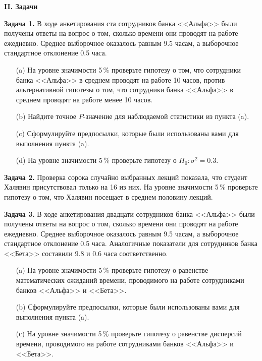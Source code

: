 \documentclass[a4paper, 12pt]{article}
\begin{document}
\textbf{II. Задачи}

\medskip

\textbf{Задача 1.} В ходе анкетирования ста сотрудников банка <<Альфа>> были получены ответы на вопрос о том, сколько времени они проводят на работе ежедневно. Среднее выборочное оказалось равным 9.5 часам, а выборочное стандартное отклонение 0.5 часа.
\begin{itemize}
  \item[(a)] На уровне значимости 5\,\% проверьте гипотезу о том, что сотрудники банка <<Альфа>> в среднем проводят на работе 10 часов, против альтернативной гипотезы о том, что сотрудники банка <<Альфа>> в среднем проводят на работе менее 10 часов.
  \item[(b)] Найдите точное $P$-значение для наблюдаемой статистики из пункта (a).
  \item[(c)] Сформулируйте предпосылки, которые были использованы вами для выполнения пункта (a).
  \item[(d)] На уровне значимости 5\,\% проверьте гипотезу о $H_0 \colon \sigma^2 = 0.3$.
\end{itemize}


\medskip

\textbf{Задача 2.}
Проверка сорока случайно выбранных лекций показала, что студент Халявин присутствовал только на 16 из них. На уровне значимости 5\,\% проверьте гипотезу о том, что Халявин посещает в среднем половину лекций.

\medskip

\textbf{Задача 3.}
В ходе анкетирования двадцати сотрудников банка <<Альфа>> были получены ответы на вопрос о том, сколько времени они проводят на работе ежедневно. Среднее выборочное оказалось равным 9.5 часам, а выборочное стандартное отклонение 0.5 часа. Аналогичные показатели для сотрудников банка <<Бета>> составили 9.8 и 0.6 часа соответственно.
\begin{itemize}
  \item[(a)] На уровне значимости 5\,\% проверьте гипотезу о равенстве математических ожиданий времени, проводимого на работе сотрудниками банков <<Альфа>> и <<Бета>>.
  \item[(b)] Сформулируйте предпосылки, которые были использованы вами для выполнения пункта (a).
  \item[(с)] На уровне значимости 5\,\% проверьте гипотезу о равенстве дисперсий времени, проводимого на работе сотрудниками банков <<Альфа>> и <<Бета>>.
\end{itemize}
\end{document}
